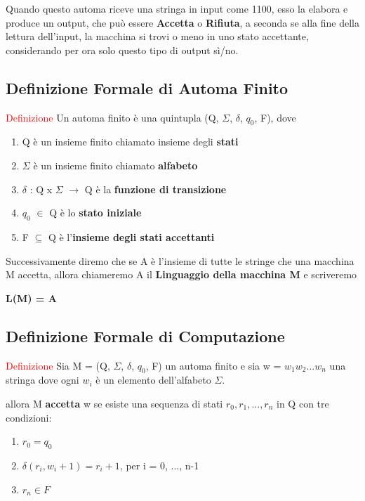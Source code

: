 \documentclass{article}
\begin{document}
Quando questo automa riceve una stringa in input come 1100, esso la elabora e produce un output, che può essere \textbf{Accetta} o \textbf{Rifiuta}, a seconda se alla fine della lettura dell'input, la macchina si trovi o meno in uno stato accettante, considerando per ora solo questo tipo di output sì/no.

\subsection{Definizione Formale di Automa Finito}

\textcolor{red}{Definizione}
Un automa finito è una quintupla (Q, $\Sigma$, $\delta$, $q_0$, F), dove
\begin{enumerate}
    \item Q è un insieme finito chiamato insieme degli \textbf{stati}
    \item $\Sigma$ è un insieme finito chiamato \textbf{alfabeto}
    \item $\delta$ : Q x $\Sigma$ $\rightarrow$ Q è la \textbf{funzione di transizione}
    \item $q_0$ $\in$ Q è lo \textbf{stato iniziale}
    \item F $\subseteq$ Q è l'\textbf{insieme degli stati accettanti}
\end{enumerate}

Successivamente diremo che se A è l'insieme di tutte le stringe che una macchina M accetta, allora chiameremo A il \textbf{Linguaggio della macchina M} e scriveremo

\begin{center}
    \textbf{L(M) = A}
\end{center}

\subsection{Definizione Formale di Computazione}

\textcolor{red}{Definizione}
Sia M = (Q, $\Sigma$, $\delta$, $q_0$, F) un automa finito e sia w = $w_1w_2...w_n$ una stringa dove ogni $w_i$ è un elemento dell'alfabeto $\Sigma$.

allora M \textbf{accetta} w se esiste una sequenza di stati $r_0, r_1, ..., r_n$ in Q con tre condizioni:

\begin{enumerate}
    \item $r_0 = q_0$
    \item $\delta (r_i, w_i+1) = r_i+1$, per i = 0, ..., n-1
    \item $r_n \in F$
\end{enumerate}
\end{document}
